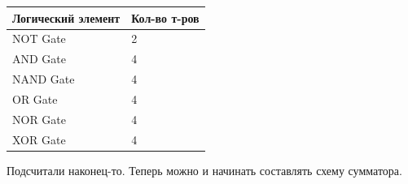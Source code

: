 \begin{table}[H]
    \centering
    \begin{tabular}{@{}ll@{}}
        \toprule
        Логический элемент & Кол-во т-ров \\ \midrule
        NOT Gate          & 2                       \\
        AND Gate          & 4                       \\
        NAND Gate         & 4                       \\
        OR Gate           & 4                       \\
        NOR Gate          & 4                       \\
        XOR Gate          & 4                       \\ \bottomrule
    \end{tabular}
\end{table}
Подсчитали наконец-то. Теперь можно и начинать составлять схему сумматора.
